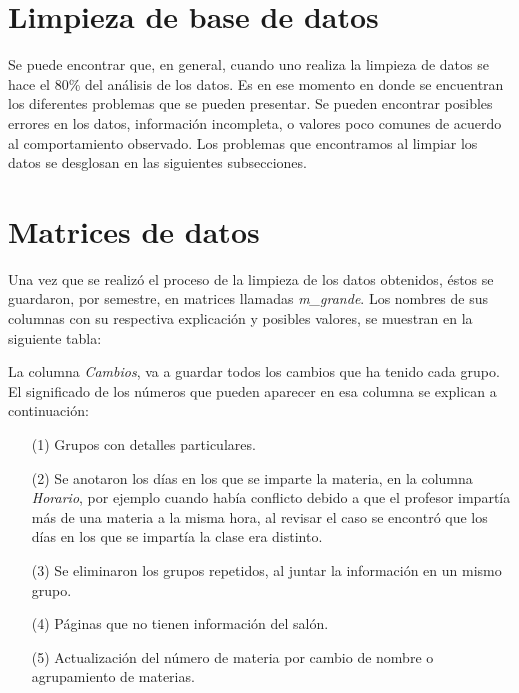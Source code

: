 \section{Limpieza de base de datos}

Se puede encontrar que, en general, cuando uno realiza la limpieza de datos se hace el 80\% del análisis de los datos. Es en ese momento en donde se encuentran los diferentes problemas que se pueden presentar. Se pueden encontrar posibles errores en los datos, información incompleta, o valores poco comunes de acuerdo al comportamiento observado. Los problemas que encontramos al limpiar los datos se desglosan en las siguientes subsecciones.


\section{Matrices de datos}

Una vez que se realizó el proceso de la limpieza de los datos obtenidos, éstos se guardaron, por semestre, en matrices llamadas \textit{m\_grande}. Los nombres de sus columnas con su respectiva explicación y posibles valores, se muestran en la siguiente tabla:

\dfNmatrizGrande %

La columna \textit{Cambios}, va a guardar todos los cambios que ha tenido cada grupo. El significado de los números que pueden aparecer en esa columna se explican a continuación:

\begin{enumerate}
\item[(1)] Grupos con detalles particulares.

\item[(2)] Se anotaron los días en los que se imparte la materia, en la columna \textit{Horario}, por ejemplo cuando había conflicto debido a que el profesor impartía más de una materia a la misma hora, al revisar el caso se encontró que los días en los que se impartía la clase era distinto.

\item[(3)] Se eliminaron los grupos repetidos, al juntar la información en un mismo grupo.

\item[(4)] Páginas que no tienen información del salón.

\item[(5)] Actualización del número de materia por cambio de nombre o agrupamiento de materias.
\end{enumerate}
